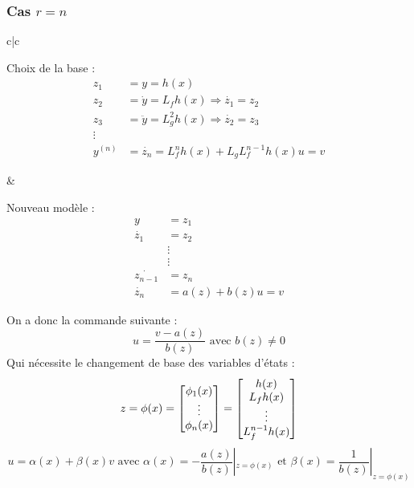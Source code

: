 \documentclass[main.tex]{subfiles}
\begin{document}
\subsubsection{Cas $r=n$}
\begin{tabular}{c|c}
\begin{minipage}[t]{0.5\linewidth}
Choix de la base : 
\[\begin{array}{ll}
z_1 & = y = h(x) \\
z_2 & = \dot{y} = L_fh(x) \Rightarrow \dot{z_1} = z_2 \\
z_3 & = \ddot{y} = L_g^2h(x) \Rightarrow \dot{z_2} = z_3 \\
\vdots \\
y^{(n)} & = \dot{z_n} = L_f^nh(x) + L_gL_f^{n-1}h(x)u = v
\end{array}\]
\end{minipage}&
\begin{minipage}[t]{0.5\linewidth}
Nouveau modèle :
\[\begin{array}{ll}
  y & = z_1 \\
\dot{z_1} & = z_2 \\
  &\vdots \\
  &\vdots\\
\dot{z_{n-1}} & = z_n \\
\dot{z_n} & = a(z) + b(z)u = v
\end{array}\]
\end{minipage}
\end{tabular}
On a donc la commande suivante :\[ u = \frac{v-a(z)}{b(z)} \text{ avec } b(z) \neq 0 \]
Qui nécessite le changement de base des variables d'états :
\[ z = \phi(x) = \begin{bmatrix} \phi_1(x) \\ \vdots \\ \phi_n(x) \end{bmatrix} = \begin{bmatrix}  h(x) \\ L_fh(x) \\ \vdots \\ L_f^{n-1}h(x) \end{bmatrix} \]
\[ u = \alpha(x)+\beta(x)v \text{ avec } \alpha(x) = -\frac{a(z)}{b(z)}|_{z=\phi(x)} \text{ et } \beta(x) = \frac{1}{b(z)}|_{z=\phi(x)} \]
\end{document}
